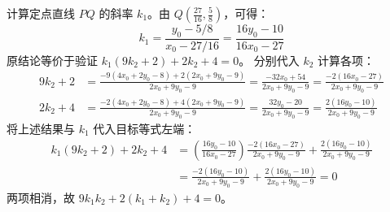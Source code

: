\begin{solution}
计算定点直线 $PQ$ 的斜率 $k_1$。由 $Q\left(\frac{27}{16}, \frac{5}{8}\right)$，可得：
$$ k_1 = \frac{y_0 - 5/8}{x_0 - 27/16} = \frac{16y_0 - 10}{16x_0 - 27} $$
原结论等价于验证 $k_1(9k_2 + 2) + 2k_2 + 4 = 0$。
分别代入 $k_2$ 计算各项：
\begin{align*}
9k_2 + 2 &= \frac{-9(4x_0 + 2y_0 - 8) + 2(2x_0 + 9y_0 - 9)}{2x_0 + 9y_0 - 9} = \frac{-32x_0 + 54}{2x_0 + 9y_0 - 9} = \frac{-2(16x_0 - 27)}{2x_0 + 9y_0 - 9} \\
2k_2 + 4 &= \frac{-2(4x_0 + 2y_0 - 8) + 4(2x_0 + 9y_0 - 9)}{2x_0 + 9y_0 - 9} = \frac{32y_0 - 20}{2x_0 + 9y_0 - 9} = \frac{2(16y_0 - 10)}{2x_0 + 9y_0 - 9}
\end{align*}
将上述结果与 $k_1$ 代入目标等式左端：
\begin{align*}
k_1(9k_2 + 2) + 2k_2 + 4 &= \left(\frac{16y_0 - 10}{16x_0 - 27}\right) \frac{-2(16x_0 - 27)}{2x_0 + 9y_0 - 9} + \frac{2(16y_0 - 10)}{2x_0 + 9y_0 - 9} \\
&= \frac{-2(16y_0 - 10)}{2x_0 + 9y_0 - 9} + \frac{2(16y_0 - 10)}{2x_0 + 9y_0 - 9} = 0
\end{align*}
两项相消，故 $9k_1 k_2 + 2(k_1 + k_2) + 4 = 0$。
\end{solution}


